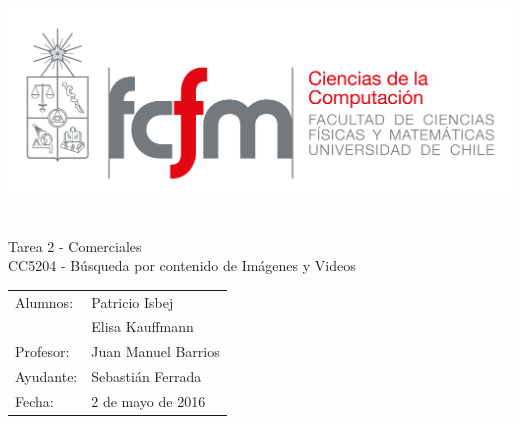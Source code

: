 \documentclass[14pt,letterpaper,hidelinks]{extarticle}
\begin{document}
\thispagestyle{empty}
\renewcommand*\listtablename{Índice de tablas}
\renewcommand{\contentsname}{\'Indice}
\renewcommand*{\refname}{}

\newpage
\pagestyle{fancy}
\fancyhf{}
\hbox{\includegraphics[scale=0.3]{img/fcfm_dcc_png.png} }
\vspace*{4cm}
\begin{center}
\Huge  {Tarea 2 - Comerciales}\\
\vspace{1cm}
\Large {CC5204 - Búsqueda por contenido de Imágenes y Videos}\\


\vspace{1cm}
\end{center}
\begin{flushright}
\begin{table}[h]
	\large
	\centering
	\begin{tabular}{ll}
		Alumnos: & Patricio Isbej\\
				& Elisa Kauffmann\\
		Profesor: & Juan Manuel Barrios\\
		Ayudante: & Sebastián Ferrada\\
		Fecha: & 2 de mayo de 2016
	\end{tabular}
\end{table}
\end{flushright}

\newpage
\pagestyle{fancy}
\fancyhf{}

\fancyhead[R]{\small \rm \textbf{\thepage}} %
\end{document}
